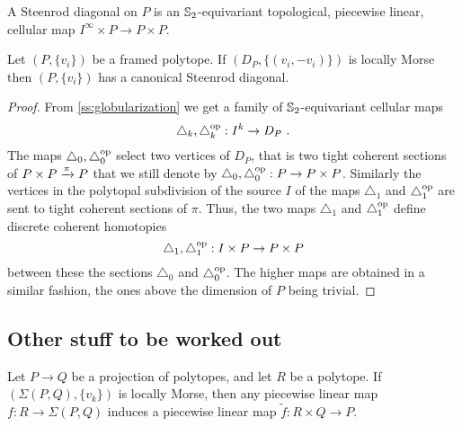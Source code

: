 \begin{definition}
	A Steenrod diagonal on $P$ is an $\mathbb{S}_2$-equivariant topological, piecewise linear, cellular map $I^\infty \times P \to P \times P$.
\end{definition}


\begin{theorem}
	Let $(P,\{v_i\})$ be a framed polytope.
	If $(D_P, \{(v_i,-v_i)\})$ is locally Morse then
	$(P,\{v_i\})$ has a canonical Steenrod diagonal.
\end{theorem}

\begin{proof}
	From \cref{ss:globularization} we get a family of $\mathbb{S}_2$-equivariant cellular maps
	\[
	\triangle_k, \triangle_k^{\mathrm{op}} : I^k \to D_P \ .
	\]
	The maps $\triangle_0, \triangle_0^{\mathrm{op}}$ select two vertices of $D_P$, that is two tight coherent sections of $P\times P \xrightarrow{\pi} P$ that we still denote by $\triangle_0, \triangle_0^{\mathrm{op}} : P \to P\times P$.
	Similarly the vertices in the polytopal subdivision of the source $I$ of the maps $\triangle_1$ and $\triangle_1^{\mathrm{op}}$ are sent to tight coherent sections of $\pi$.
	Thus, the two maps $\triangle_1$ and $\triangle_1^{\mathrm{op}}$ define discrete coherent homotopies
	\[
	\triangle_1, \triangle_1^{\mathrm{op}} : I\times P \to P \times P
	\]
	between these the sections $\triangle_0$ and $\triangle_0^{\mathrm{op}}$.
	The higher maps are obtained in a similar fashion, the ones above the dimension of $P$ being trivial.
\end{proof}



\subsection{Other stuff to be worked out}

\begin{theorem}
	Let $P \to Q$ be a projection of polytopes, and let $R$ be a polytope. 
	If $(\Sigma(P,Q), \{v_k\})$ is locally Morse, then any piecewise linear map $f: R \to \Sigma(P,Q)$ induces a piecewise linear map $\tilde f : R \times Q \to P$. 
\end{theorem}

